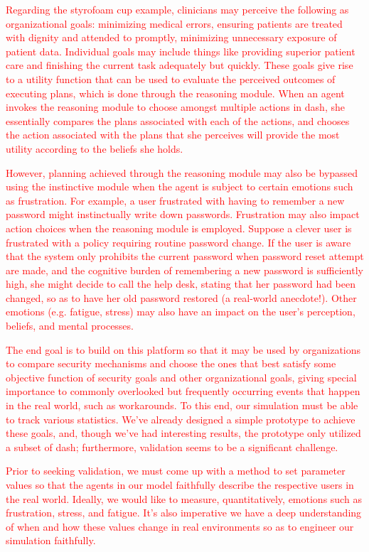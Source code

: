 \documentclass{acm_proc_article-sp}
\begin{document}
\textcolor{red}{Regarding the styrofoam cup example, clinicians may perceive the 
following as organizational goals: minimizing medical errors, ensuring patients 
are treated with dignity and attended to promptly, minimizing unnecessary 
exposure of patient data. Individual goals may include things like providing 
superior patient care and finishing the current task adequately but quickly. 
These goals give rise to a utility function that can be used to evaluate the 
perceived outcomes of executing plans, which is done through 
the reasoning module. When an agent invokes the reasoning module to 
choose amongst multiple actions in {\sc dash}, she essentially compares the 
plans associated with each of the actions, and chooses the action associated
with the plans that she perceives will provide the most utility according to the 
beliefs she holds.}
 
\textcolor{red}{However, planning achieved through the reasoning module
may also be bypassed using the instinctive module when the agent is subject to certain 
emotions such as frustration. For example, a user frustrated with having to 
remember a new password might instinctually write down passwords.
Frustration may also impact action choices when the reasoning 
module is employed. Suppose a clever user is frustrated with a policy requiring
routine password change. If the user is aware that the system only prohibits 
the current password when password reset attempt are made, and the 
cognitive burden of remembering a new password is sufficiently high, 
she might decide to call the help desk, stating that her password had been 
changed, so as to have her old password restored (a real-world anecdote!). 
Other emotions (e.g. fatigue, stress) may also have an impact on the user's 
perception, beliefs, and mental processes.}
 
\textcolor{red}{The end goal is to build on this platform so that it may be 
used by organizations to compare security mechanisms and choose the 
ones that best satisfy some objective function of security goals 
and other organizational goals, giving special importance to commonly 
overlooked but frequently occurring events that happen in the real world, 
such as workarounds. To this end, our simulation must be able to 
track various statistics. We've already designed a simple prototype to 
achieve these goals, and, though we've had 
interesting results, the prototype only utilized a subset of {\sc dash}; furthermore, 
validation seems to be a significant challenge.}
 
 \textcolor{red}{Prior to seeking validation, we must come up with a method to 
set parameter values so that the agents in our model faithfully describe 
the respective users in the real world. Ideally, we would like to measure, 
quantitatively, emotions such as frustration, stress, and fatigue. It's also 
imperative we have a deep understanding of when and how these values 
change in real environments so as to engineer our simulation faithfully.}
\end{document}
